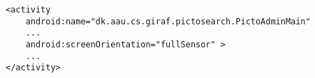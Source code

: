 \begin{minipage}[H]{\linewidth}
\begin{lstlisting}[caption = Allowing changes to the screen orientation., label = OrientAllow] 
<activity
	android:name="dk.aau.cs.giraf.pictosearch.PictoAdminMain"
    ...
    android:screenOrientation="fullSensor" >
    ...
</activity>
\end{lstlisting}
\end{minipage}


























